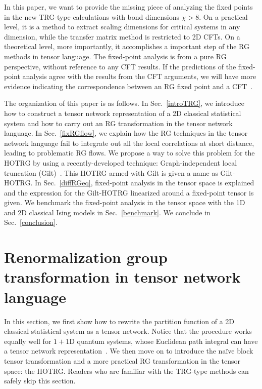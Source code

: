 \documentclass[aps,prb,reprint,superscriptaddress]{revtex4-2}
\begin{document}
In this paper, we want to provide the missing piece of analyzing the
fixed points in the new TRG-type calculations with bond dimensions $\chi
> 8$. On a practical level, it is a method to extract scaling dimensions
for critical systems in any dimension, while the transfer matrix method
is restricted to 2D CFTs. On a theoretical level, more importantly, it
accomplishes a important step of the RG methods in tensor language. The
fixed-point analysis is from a pure RG perspective, without reference to
any CFT results. If the predictions of the fixed-point analysis agree
with the results from the CFT arguments, we will have more evidence
indicating the correspondence between an RG fixed point and a
CFT~\cite{poland2019}.
%

The organization of this paper is as follows. In Sec.~\ref{introTRG}, we
introduce how to construct a tensor network representation of a 2D
classical statistical system and how to carry out an RG transformation
in the tensor network language. In Sec.~\ref{fixRGflow}, we explain how
the RG techniques in the tensor network language fail to integrate out
all the local correlations at short distance, leading to problematic RG
flows.  We propose a way to solve this problem for the HOTRG by using a
recently-developed technique: Graph-independent local truncation
(Gilt)~\cite{gilts}. This HOTRG armed with Gilt is given a name as
Gilt-HOTRG.  In Sec.~\ref{diffRGeq}, fixed-point analysis in the tensor
space is explained and the expression for the Gilt-HOTRG linearized
around a fixed-point tensor is given. We benchmark the fixed-point
analysis in the tensor space with the 1D and 2D classical Ising models
in Sec.~\ref{benchmark}. We conclude in Sec.~\ref{conclusion}.

\section{Renormalization group transformation in tensor network
language\label{introTRG}} In this section, we first show how to rewrite
the partition function of a 2D classical statistical system as a tensor
network.  Notice that the procedure works equally well for $1 + 1$D
quantum systems, whose Euclidean path integral can have a tensor network
representation~\cite{GuWen2009}. We then move on to introduce the
na\"ive block tensor transformation and a more practical RG
transformation in the tensor space: the HOTRG. Readers who are familiar
with the TRG-type methods can safely skip this section.
%
\end{document}
